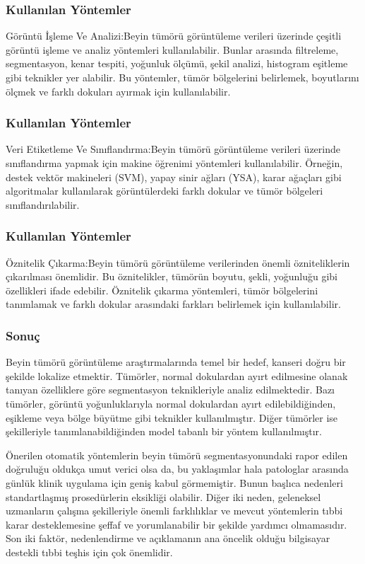 \documentclass[10pt,xcolor=dvipsnames]{beamer}
\begin{document}
\begin{frame}
\frametitle{Kullanılan Yöntemler}
Görüntü İşleme Ve Analizi:Beyin tümörü görüntüleme verileri üzerinde çeşitli görüntü işleme ve analiz yöntemleri kullanılabilir. Bunlar arasında filtreleme, segmentasyon, kenar tespiti, yoğunluk ölçümü, şekil analizi, histogram eşitleme gibi teknikler yer alabilir. Bu yöntemler, tümör bölgelerini belirlemek, boyutlarını ölçmek ve farklı dokuları ayırmak için kullanılabilir.
\end{frame}

\begin{frame}
\frametitle{Kullanılan Yöntemler}
Veri Etiketleme Ve Sınıflandırma:Beyin tümörü görüntüleme verileri üzerinde sınıflandırma yapmak için makine öğrenimi yöntemleri kullanılabilir. Örneğin, destek vektör makineleri (SVM), yapay sinir ağları (YSA), karar ağaçları gibi algoritmalar kullanılarak görüntülerdeki farklı dokular ve tümör bölgeleri sınıflandırılabilir.
\end{frame}

\begin{frame}
\frametitle{Kullanılan Yöntemler}
Öznitelik Çıkarma:Beyin tümörü görüntüleme verilerinden önemli özniteliklerin çıkarılması önemlidir. Bu öznitelikler, tümörün boyutu, şekli, yoğunluğu gibi özellikleri ifade edebilir. Öznitelik çıkarma yöntemleri, tümör bölgelerini tanımlamak ve farklı dokular arasındaki farkları belirlemek için kullanılabilir.
\end{frame}

\begin{frame}
\frametitle{Sonuç}
Beyin tümörü görüntüleme araştırmalarında temel bir hedef, kanseri doğru bir şekilde lokalize etmektir. Tümörler, normal dokulardan ayırt edilmesine olanak tanıyan özelliklere göre segmentasyon teknikleriyle analiz edilmektedir. Bazı tümörler, görüntü yoğunluklarıyla normal dokulardan ayırt edilebildiğinden, eşikleme veya bölge büyütme gibi teknikler kullanılmıştır. Diğer tümörler ise şekilleriyle tanımlanabildiğinden model tabanlı bir yöntem kullanılmıştır.

Önerilen otomatik yöntemlerin beyin tümörü segmentasyonundaki rapor edilen doğruluğu oldukça umut verici olsa da, bu yaklaşımlar hala patologlar arasında günlük klinik uygulama için geniş kabul görmemiştir. Bunun başlıca nedenleri standartlaşmış prosedürlerin eksikliği olabilir. Diğer iki neden, geleneksel uzmanların çalışma şekilleriyle önemli farklılıklar ve mevcut yöntemlerin tıbbi karar desteklemesine şeffaf ve yorumlanabilir bir şekilde yardımcı olmamasıdır. Son iki faktör, nedenlendirme ve açıklamanın ana öncelik olduğu bilgisayar destekli tıbbi teşhis için çok önemlidir.
\end{frame}
\end{document}
